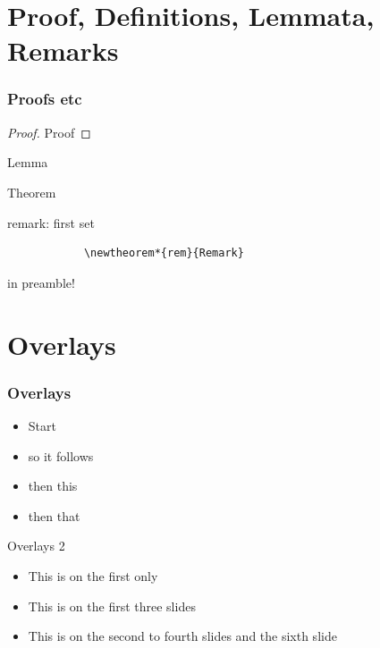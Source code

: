 \section{Proof, Definitions, Lemmata, Remarks}


\begin{frame}[fragile] %
	\frametitle{Proofs etc}

    \begin{proof}
        Proof
    \end{proof}
    
    \begin{lemma}[XY -- A dual zu YX]
        Lemma
    \end{lemma}
    
    \begin{theorem}
        Theorem
    \end{theorem}
    
     \begin{rem}
		remark: first set
		  \begin{verbatim}
		    \newtheorem*{rem}{Remark}
		  \end{verbatim}
		  in preamble! 
     \end{rem}
\end{frame}








\section{Overlays}


\begin{frame}
	\frametitle{Overlays}
   \begin{itemize}
        \item Start
        \item<2-> so it follows
        \item<3-> then this
        \item<4-> then that
   \end{itemize}
\end{frame}



\begin{frame}{Overlays 2}
	\begin{itemize}
		\item<1> This is on the first only
		\item<-3> This is on the first three slides
		\item<2-4,6> This is on the second to fourth slides and the sixth slide
	\end{itemize}
\end{frame}




